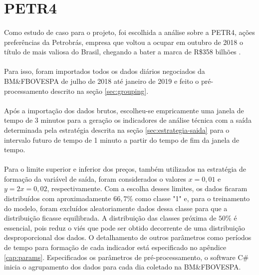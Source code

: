 \documentclass[grad,numbers]{coppe}
\begin{document}
        \section{PETR4}
    
            \paragraph{}Como estudo de caso para o projeto, foi escolhida a análise sobre a PETR4, ações preferências da Petrobrás, empresa que voltou a ocupar em outubro de 2018 o título de mais valiosa do Brasil, chegando a bater a marca de R\$358 bilhões \cite{petr4-intro}. 
            
            \paragraph{}Para isso, foram importados todos os dados diários negociados da BM\&FBOVESPA de julho de 2018 até janeiro de 2019 e feito o pré-processamento descrito na seção \ref{sec:grouping}.
            
            \paragraph{}Após a importação dos dados brutos, escolheu-se empricamente uma janela de tempo de 3 minutos para a geração os indicadores de análise técnica com a saída determinada pela estratégia descrita na seção \ref{sec:estrategia-saida} para o intervalo futuro de tempo de 1 minuto a partir do tempo de fim da janela de tempo. 
            
            \paragraph{}Para o limite superior e inferior dos preços, também utilizados na estratégia de formação da variável de saída, foram considerados o valores $x = 0,01$ e $y = 2x = 0,02$, respectivamente. Com a escolha desses limites, os dados ficaram distribuídos com aproximadamente $66,7\%$ como classe "1" e, para o treinamento do modelo, foram excluídos aleatoriamente dados dessa classe para que a distribuição ficasse equilibrada. A distribuição das classes próxima de $50\%$ é essencial, pois reduz o viés que pode ser obtido decorrente de uma distribuição desproporcional dos dados. O detalhamento de outros parâmetros como períodos de tempo para formação de cada indicador está especificado no apêndice \ref{cap:params}. Especificados os parâmetros de pré-processamento, o software C\# inicia o agrupamento dos dados para cada dia coletado na BM\&FBOVESPA.
            
\end{document}
